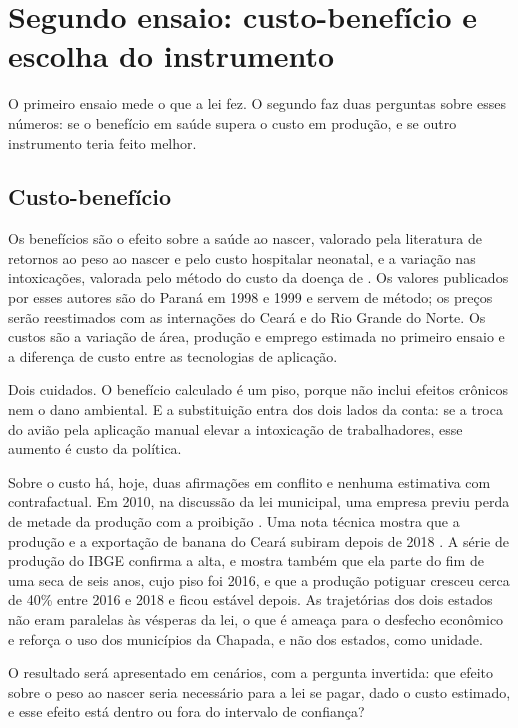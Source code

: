 \section{Segundo ensaio: custo-benefício e escolha do instrumento}
\label{sec:cb}

O primeiro ensaio mede o que a lei fez. O segundo faz duas perguntas sobre
esses números: se o benefício em saúde supera o custo em produção, e se outro
instrumento teria feito melhor.

\subsection{Custo-benefício}

Os benefícios são o efeito sobre a saúde ao nascer, valorado pela literatura de
retornos ao peso ao nascer e pelo custo hospitalar neonatal, e a variação nas
intoxicações, valorada pelo método do custo da doença de
. Os valores publicados por
esses autores são do Paraná em 1998 e 1999 e servem de método; os preços serão
reestimados com as internações do Ceará e do Rio Grande do Norte. Os custos são
a variação de área, produção e emprego estimada no primeiro ensaio e a
diferença de custo entre as tecnologias de aplicação.

Dois cuidados. O benefício calculado é um piso, porque não inclui efeitos
crônicos nem o dano ambiental. E a substituição entra dos dois lados da conta:
se a troca do avião pela aplicação manual elevar a intoxicação de
trabalhadores, esse aumento é custo da política.

Sobre o custo há, hoje, duas afirmações em conflito e nenhuma estimativa com
contrafactual. Em 2010, na discussão da lei municipal, uma empresa previu perda
de metade da produção com a proibição \cite[p.~169]{marinho2011dimensao}. Uma
nota técnica mostra que a produção e a exportação de banana do Ceará subiram
depois de 2018 \cite{cavalcante2022nota}. A série de produção do IBGE confirma
a alta, e mostra também que ela parte do fim de uma seca de seis anos, cujo
piso foi 2016, e que a produção potiguar cresceu cerca de 40\% entre 2016 e
2018 e ficou estável depois. As trajetórias dos dois estados não eram paralelas
às vésperas da lei, o que é ameaça para o desfecho econômico e reforça o uso
dos municípios da Chapada, e não dos estados, como unidade.

O resultado será apresentado em cenários, com a pergunta invertida: que efeito
sobre o peso ao nascer seria necessário para a lei se pagar, dado o custo
estimado, e esse efeito está dentro ou fora do intervalo de confiança?

